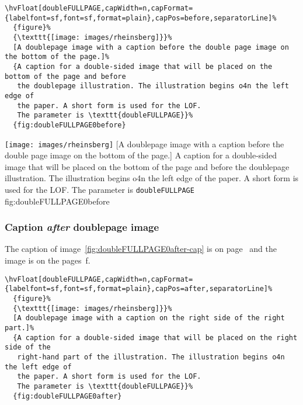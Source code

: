 \documentclass[twoside]{scrartcl}
\let\hvBlindtext\Blindtext
\def\Blindtext{\par\color{black!40}\hvBlindtext\par\normalcolor}
\begin{document}
\begin{lstlisting}
\hvFloat[doubleFULLPAGE,capWidth=n,capFormat={labelfont=sf,font=sf,format=plain},capPos=before,separatorLine]%
  {figure}%
  {\texttt{[image: images/rheinsberg]}}%
  [A doublepage image with a caption before the double page image on the bottom of the page.]%
  {A caption for a double-sided image that will be placed on the bottom of the page and before
   the doublepage illustration. The illustration begins o4n the left edge of 
   the paper. A short form is used for the LOF. 
   The parameter is \texttt{doubleFULLPAGE}}%
  {fig:doubleFULLPAGE0before}
\end{lstlisting}


%
  {\texttt{[image: images/rheinsberg]}}%
  [A doublepage image with a caption before the double page image on the bottom of the page.]%
  {A caption for a double-sided image that will be placed on the bottom of the page and before
   the doublepage illustration. The illustration begins o4n the left edge of 
   the paper. A short form is used for the LOF. 
   The parameter is \texttt{doubleFULLPAGE}}%
  {fig:doubleFULLPAGE0before}

\Blindtext

\Blindtext


\subsubsection{Caption \emph{after} doublepage image}
The caption of image~\ref{fig:doubleFULLPAGE0after-cap} is on page~\pageref{fig:doubleFULLPAGE0after-cap} and the image
is on the pages~\pageref{fig:doubleFULLPAGE0after}f.

\begin{lstlisting}
\hvFloat[doubleFULLPAGE,capWidth=n,capFormat={labelfont=sf,font=sf,format=plain},capPos=after,separatorLine]%
  {figure}%
  {\texttt{[image: images/rheinsberg]}}%
  [A doublepage image with a caption on the right side of the right part.]%
  {A caption for a double-sided image that will be placed on the right side of the
   right-hand part of the illustration. The illustration begins o4n the left edge of 
   the paper. A short form is used for the LOF. 
   The parameter is \texttt{doubleFULLPAGE}}%
  {fig:doubleFULLPAGE0after}
\end{lstlisting}
\end{document}
